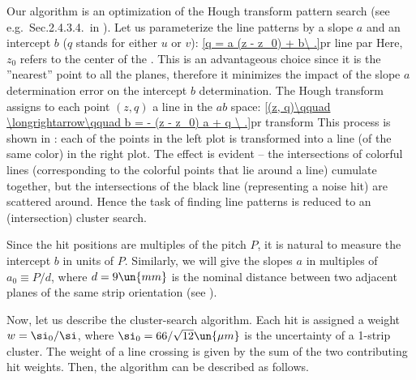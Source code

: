 Our algorithm is an optimization of the Hough transform pattern search (see e.g.~Sec.2.4.3.4.~in ). Let us parameterize the line patterns by a slope $a$ and an intercept $b$ ($q$ stands for either $u$ or $v$):
\eqref{q = a (z - z_0) + b\ .}{pr line par}
Here, $z_0$ refers to the center of the . This is an advantageous choice since it is the ''nearest'' point to all the planes, therefore it minimizes the impact of the slope $a$ determination error on the intercept $b$ determination. The Hough transform assigns to each point $(z, q)$ a line in the $ab$ space:
\eqref{(z, q)\qquad \longrightarrow\qquad b = - (z - z_0) a + q \ .}{pr transform}
This process is shown in : each of the points in the left plot is transformed into a line (of the same color) in the right plot. The effect is evident -- the intersections of colorful lines (corresponding to the colorful points that lie around a line) cumulate together, but the intersections of the black line (representing a noise hit) are scattered around. Hence the task of finding line patterns is reduced to an (intersection) cluster search.

Since the hit positions are multiples of the pitch $P$, it is natural to measure the intercept $b$ in units of $P$. Similarly, we will give the slopes $a$ in multiples of $a_0 \equiv P / d$, where $d = 9 \un{mm}$ is the nominal distance between two adjacent planes of the same strip orientation (see ).


Now, let us describe the cluster-search algorithm. Each hit is assigned a weight $w = \si_0/\si$, where $\si_0 = 66/\sqrt{12} \un{\mu m}$ is the uncertainty of a 1-strip cluster. The weight of a line crossing is given by the sum of the two contributing hit weights. Then, the algorithm can be described as follows.

